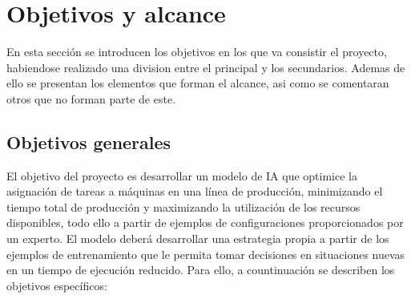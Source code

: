 \section{Objetivos y alcance}
En esta sección se introducen los objetivos en los que va consistir el proyecto, habiendose
realizado una division entre el principal y los secundarios. Ademas de ello se presentan los elementos
que forman el alcance, asi como se comentaran otros que no forman parte de este.  

\subsection{Objetivos generales}
El objetivo del proyecto es desarrollar un modelo de IA que optimice la asignación 
de tareas a máquinas en una línea de producción, minimizando el tiempo total de 
producción y maximizando la utilización de los recursos disponibles, todo ello 
a partir de ejemplos de configuraciones proporcionados por un experto. El modelo 
deberá desarrollar una estrategia propia a partir de los ejemplos de entrenamiento
que le permita tomar decisiones en situaciones nuevas en un tiempo de ejecución
reducido. Para ello, a countinuación se describen los objetivos específicos:

